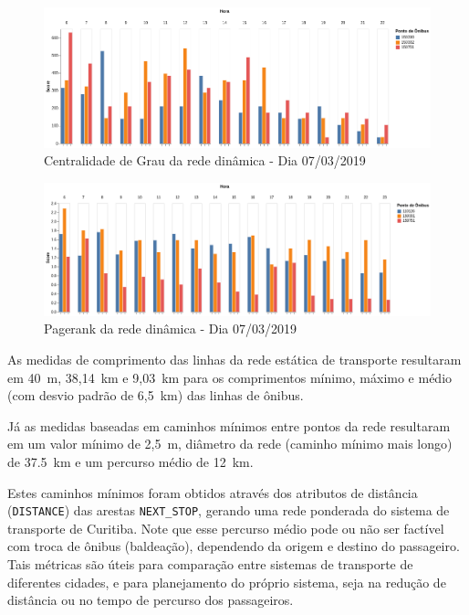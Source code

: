    


\begin{figure}
\centering
\includegraphics[width=.9\textwidth]{Capitulo4/img/centralidade-grau-rede-dinamica.png}
\caption{Centralidade de Grau da rede dinâmica - Dia 07/03/2019}
\label{fig:centralidade-grau-rede-dinamica}
\end{figure}



\begin{figure}
\centering
\includegraphics[width=.9\textwidth]{Capitulo4/img/pagerank-rede-dinamica.png}
\caption{Pagerank da rede dinâmica - Dia 07/03/2019}
\label{fig:pagerank-rede-dinamica}
\end{figure}


As medidas de comprimento das linhas da rede estática de transporte resultaram em 40~m, 38,14~km e 9,03~km para os comprimentos mínimo, máximo e médio (com desvio padrão de 6,5~km) das linhas de ônibus.

Já as medidas baseadas em caminhos mínimos entre pontos da rede resultaram em um valor mínimo de 2,5~m, diâmetro da rede (caminho mínimo mais longo) de 37.5~km e um percurso médio de 12~km. 

Estes caminhos mínimos foram obtidos através dos atributos de distância (\texttt{DISTANCE}) das arestas \texttt{NEXT\_STOP}, gerando uma rede ponderada do sistema de transporte de Curitiba. Note que esse percurso médio pode ou não ser factível com troca de ônibus (baldeação), dependendo da origem e destino do passageiro.
Tais métricas são úteis para comparação entre sistemas de transporte de diferentes cidades, e para planejamento do próprio sistema, seja na redução de distância ou no tempo de percurso dos passageiros.

